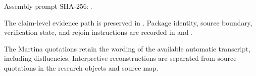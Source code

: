 \documentclass[
  11pt,
  letterpaper,
]{article}
\begin{document}
Assembly prompt SHA-256:
.

The claim-level evidence path is preserved in
. Package
identity, source boundary, verification state, and rejoin instructions
are recorded in  and
.

The Martina quotations retain the wording of the available automatic
transcript, including disfluencies. Interpretive reconstructions are
separated from source quotations in the research objects and source map.
\end{document}
